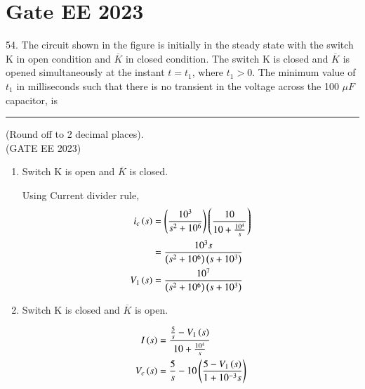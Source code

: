 \documentclass[journal,12pt,twocolumn]{IEEEtran}
\begin{document}


\vspace{3cm}

\title{}
\author{EE23BTECH11054 -  Sai Krishna Shanigarapu$^{*}$
}
\maketitle
\newpage
\bigskip


\section*{Gate EE 2023}
54. \hspace{2pt}The circuit shown in the figure is initially in the steady state with the switch K in open condition and $\overline{K}$ in closed condition. The switch K is closed and $\overline{K}$ is opened simultaneously at the instant $t = t_1$, where $t_1 > 0$. The minimum value of $t_1$ in milliseconds such that there is no transient in the voltage across the 100 $\mu F$ capacitor, is \rule{1cm}{0.15mm} (Round off to 2 decimal places).\\ (GATE EE 2023)

\begin{figure}[ht]
  \centering
  \resizebox{0.8\columnwidth}{!}{}
\end{figure}

\solution
\begin{enumerate}
\item Switch K is open and $\overline{K}$ is closed.
\begin{figure}[ht]
  \centering
  \resizebox{0.50\columnwidth}{!}{}
\end{figure}

Using Current divider rule,
\begin{align}
    i_c\left(s\right) &= \left(\frac{10^3}{s^2 + 10^6}\right)\left(\frac{10}{10 + \frac{10^4}{s}}\right)\\
    &= \frac{10^3 s}{\left(s^2 + 10^6\right)\left(s + 10^3\right)}\\
    V_1\left(s\right) &= \frac{10^7}{\left(s^2 + 10^6\right) \left(s + 10^3\right)} 
\end{align}

\item Switch K is closed and $\overline{K}$ is open.

\begin{figure}[ht]
  \centering
  \resizebox{0.55\columnwidth}{!}{}
\end{figure}



\begin{align}
    I\left(s\right) &= \frac{\frac{5}{s} - V_1\left(s\right)}{10 + \frac{10^4}{s}}\\
    V_c\left(s\right) &= \frac{5}{s} - 10\left(\frac{5-V_1\left(s\right)}{1+10^{-3}s}\right)
\end{align}
\end{enumerate}
\end{document}

